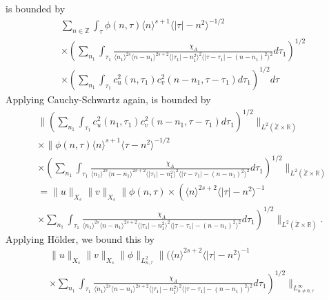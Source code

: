 \documentclass[12pt,reqno]{amsart}
\numberwithin{equation}{section}  %
\renewcommand{\cref}{\Cref}
\newcommand{\rr}{\mathbb{R}}
\newcommand{\zz}{\mathbb{Z}}
\newcommand{\zzdot}{\dot{\zz}}
\begin{document}
%
is bounded by 
%
%
\begin{equation}
	\label{10g}
	\begin{split}
    & \sum_{n \in \zzdot} \int_{\tau} \phi(n, \tau) \langle n \rangle ^{s+1}
    \langle | \tau | - n^{2} \rangle ^{-1/2}
    \\
    & \times \left( \sum_{n_{1}} \int_{\tau_{1}}
    \frac{\chi_{A}}{\langle n_{1} \rangle ^{2s} \langle n-n_{1} \rangle ^{2s+2} \langle |
    \tau_{1} | - n_{1}^{2}\rangle^{2}  \langle | \tau - \tau_{1} | -
    (n - n_{1})^{2} \rangle^{2}} d \tau_{1} \right)^{1/2}
    \\
    & \times \left( \sum_{n_{1}} \int_{\tau_{1}} c_{u}^{2}(n, \tau_{1})
    c_{v}^{2}(n - n_{1}, \tau - \tau_{1}) d \tau_{1} \right)^{1/2} d \tau
  \end{split}
\end{equation}
%
%
Applying Cauchy-Schwartz again, \cref{10g} is bounded by
%
%
\begin{equation*}
  \begin{split}
    & \|\left( \sum_{n_{1}}\int_{\tau_{1}} c_{u}^{2}(n_1, \tau_1)
  c_{v}^{2} (n - n_1, \tau - \tau_{1} ) d \tau_1  \right)^{1/2} \|_{L^{2}(\zzdot \times
		\rr)}
		\\
    & \times  \|\phi(n, \tau)  \langle n
    \rangle ^{s+1} \langle \tau - n^{2} \rangle ^{-1/2}
		\\
    & \times \left( \sum_{n_{1}} \int_{\tau_{1}} \frac{\chi_{A}}{\langle n_{1}
    \rangle ^{2s} \langle n-n_{1} \rangle ^{2s+2} \langle | \tau_{1}|-n_{1}^{2}
    \rangle^{2} \langle  |\tau -
    \tau_{1} | -(n - n_{1})^{2}
    \rangle^{2}} d \tau_1 \right)^{1/2} \|_{L^2(\zzdot \times \rr)}
		\\
    & = \|u\|_{X_{s}} \|v\|_{X_{s}} \label{holder-term}
     \|\phi(n, \tau) \times \left(  \langle n
     \rangle ^{2s+2} \langle |\tau| - n^{2} \rangle^{-1}  \right .
    \\
    & \times \left . \sum_{n_{1}} \int_{\tau_{1}} \frac{\chi_{A}}{\langle n_{1} \rangle ^{2s} \langle
n-n_{1} \rangle ^{2s+2}  \langle | \tau_{1}|-n_{1}^{2} \rangle^{2} \langle  |\tau -
    \tau_{1} | -(n - n_{1})^{2}
    \rangle^{2}} d \tau_1 \right)^{1/2} \|_{L^2(\zzdot \times \rr)}.
  \end{split}
\end{equation*}
%
Applying H{\"o}lder, we bound this by 
%
%
\begin{equation}
  \label{integral-bound-1st-form-per}
	\begin{split}
    & \|u\|_{X_{s}} \|v\|_{X_{s}} \| \phi \|_{L^{2}_{n, \tau}}
    \|\bigg (  \langle n
    \rangle ^{2s+2} \langle | \tau | - n^{2} \rangle ^{-1}
    \\
    & \times \left. 
    \sum_{n_{1}} \int_{\tau_{1}} \frac{\chi_{A}}{\langle n_{1} \rangle ^{2s} \langle
n-n_{1} \rangle ^{2s+2} \langle | \tau_{1}|-n_{1}^{2} \rangle^{2} \langle  |\tau -
    \tau_{1} | -(n - n_{1})^{2}
    \rangle^{2}} d \tau_1 \right)^{1/2} \|_{L^\infty_{n \neq 0, \tau}}
	\end{split}
\end{equation}
\end{document}
